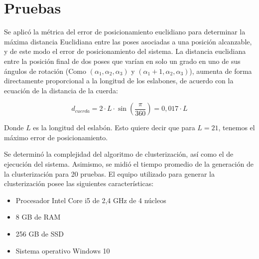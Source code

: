 \section{Pruebas}

Se aplicó la métrica del error de posicionamiento euclidiano para determinar la máxima distancia Euclidiana entre las poses asociadas a una posición alcanzable, y de este modo el error de posicionamiento del sistema. La distancia euclidiana entre la posición final de dos poses que varían en solo un grado en uno de sus ángulos de rotación (Como $(\alpha_1,\alpha_2,\alpha_3)$ y $(\alpha_1 + 1, \alpha_2, \alpha_3)$), aumenta de forma directamente proporcional a la longitud de los eslabones, de acuerdo con la ecuación de la distancia de la cuerda:

\begin{equation}
	d_{cuerda} = 2 \cdot L \cdot \sin(\frac{\pi}{360}) = 0,017 \cdot L
\end{equation}

Donde $L$ es la longitud del eslabón. Esto quiere decir que para $L = 21$, tenemos el máximo error de posicionamiento.

Se determinó la complejidad del algoritmo de clusterización, así como el de ejecución del sistema. Asimismo, se midió el tiempo promedio de la generación de la clusterización para 20 pruebas. El equipo utilizado para generar la clusterización posee las siguientes características:

\begin{itemize}
	\item Procesador Intel Core i5 de 2,4 GHz de 4 núcleos
	\item 8 GB de RAM
	\item 256 GB de SSD
	\item Sistema operativo Windows 10
\end{itemize}

